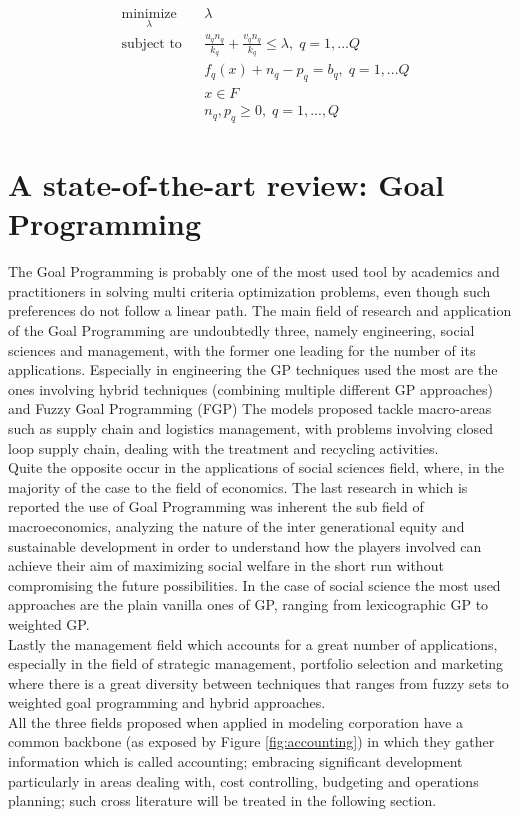 \documentclass{article}
\begin{document}
\begin{equation*}
\begin{aligned}
& \underset{\lambda}{\text{minimize}}
& & \lambda \\
& \text{subject to}
& & \frac{u_q n_q}{k_q}+\frac{v_q n_q}{k_q}\leq\lambda, \; q=1,...Q \\
& & & f_q(x)+n_q-p_q=b_q, \; q=1,...Q \\
& & & x\in F \\
& & & n_q,p_q\geq 0, \; q=1,...,Q 
\end{aligned}
\end{equation*}

\pagebreak 

\section{A state-of-the-art review: Goal Programming}
The Goal Programming is probably one of the most used tool by academics and practitioners in solving multi criteria optimization problems, even though such preferences do not follow a linear path\cite{Romero2014}\cite{Schniederjans1995}. The main field of research and application of the Goal Programming are undoubtedly three, namely engineering, social sciences and management\cite{colapinto_multi-criteria_2017}, with the former one leading for the number of its applications.
Especially in engineering the GP techniques used the most are the ones involving hybrid techniques (combining multiple different GP approaches) and Fuzzy Goal Programming (FGP) The models proposed tackle macro-areas such as supply chain and logistics management, with problems involving closed loop supply chain, dealing with the treatment and recycling activities\cite{Zarandi2011}. 
\\
Quite the opposite occur in the applications of social sciences field, where, in the majority of the case to the field of economics. The last research in which is reported the use of Goal Programming was inherent the sub field of macroeconomics, analyzing the nature of the inter generational equity and sustainable development in order to understand how the players involved can achieve their aim of maximizing social welfare in the short run without compromising the future possibilities. In the case of social science the most used approaches are the plain vanilla ones of GP, ranging from lexicographic GP to weighted GP.
\\
Lastly the management field which accounts for a great number of applications, especially in the field of strategic management, portfolio selection and marketing where there is a great diversity between techniques that ranges from fuzzy sets\cite{Trenado2014} to weighted goal programming and hybrid approaches.
\\
All the three fields proposed when applied in modeling corporation have a common backbone (as exposed by Figure \ref{fig:accounting})  in which they gather information which is called accounting; embracing significant development particularly in areas dealing with, cost controlling, budgeting and operations planning; such cross literature will be treated in the following section.
\end{document}
